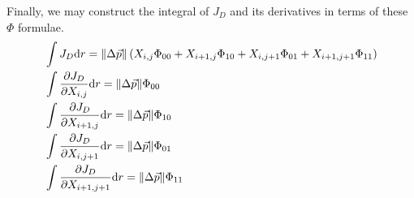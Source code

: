 Finally, we may construct the integral of $J_D$ and its derivatives in terms of these $\Phi$ formulae.
\begin{subequations}\label{eqn:JDPhi:all}
\begin{align}
&\int J_D \mathrm{d}r = \|\Delta \vec{p}\| \left( X_{i,j} \Phi_{00} + X_{i+1,j} \Phi_{10} + X_{i,j+1} \Phi_{01} + X_{i+1,j+1} \Phi_{11} \right)\\
&\int \frac{\partial J_D}{\partial X_{i,j}} \mathrm{d} r = \|\Delta \vec{p}\| \Phi_{00}\\
&\int \frac{\partial J_D}{\partial X_{i+1,j}} \mathrm{d} r = \|\Delta \vec{p}\| \Phi_{10}\\
&\int \frac{\partial J_D}{\partial X_{i,j+1}} \mathrm{d} r = \|\Delta \vec{p}\| \Phi_{01}\\
&\int \frac{\partial J_D}{\partial X_{i+1,j+1}} \mathrm{d} r = \|\Delta \vec{p}\| \Phi_{11}
\end{align}
\end{subequations}


